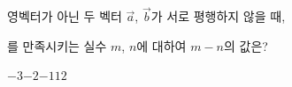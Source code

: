 영벡터가 아닌 두 벡터 $\vec{a}$, $\vec{b}$가 서로 평행하지 않을 때, \par\smallskip{}\par\smallskip\noindent 를 만족시키는 실수 $m$, $n$에 대하여 $m-n$의 값은?
\begin{choices32}{$-3$}{$-2$}{$-1$}{$1$}{$2$}\end{choices32}
